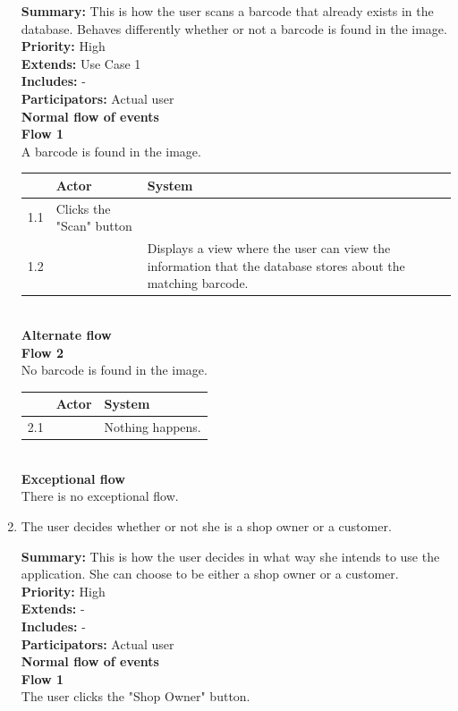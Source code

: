 \documentclass{report}
\begin{document}
\begin{enumerate}
    \textbf{Summary:} This is how the user scans a barcode that already exists in the database. Behaves differently whether or not a barcode is found in the image. \\
    \textbf{Priority:} High \\
    \textbf{Extends:} Use Case 1 \\
    \textbf{Includes:} - \\
    \textbf{Participators:} Actual user \\
    \textbf{Normal flow of events} \\
    \textbf{Flow 1} \\ A barcode is found in the image. \\

    \begin{tabular}{ | l | p{4cm} | p{4cm} |}
    \hline
      & Actor & System \\ \hline
    1.1 & Clicks the "Scan" button & \\ \hline
    1.2 & & Displays a view where the user can view the information that the database stores about the matching barcode. \\
    \hline
    \end{tabular} \\

    \textbf{Alternate flow} \\
    \textbf{Flow 2} \\ No barcode is found in the image. \\

    \begin{tabular}{ | l | p{4cm} | p{4cm} |}
    \hline
      & Actor & System \\ \hline
    2.1 & & Nothing happens. \\
    \hline
    \end{tabular} \\

    \textbf{Exceptional flow} \\ There is no exceptional flow.

  \item The user decides whether or not she is a shop owner or a customer. \

    \textbf{Summary:} This is how the user decides in what way she intends to use the application. She can choose to be either a shop owner or a customer. \\
    \textbf{Priority:} High \\
    \textbf{Extends:} - \\
    \textbf{Includes:} - \\
    \textbf{Participators:} Actual user \\
    \textbf{Normal flow of events} \\
    \textbf{Flow 1} \\ The user clicks the "Shop Owner" button. \\


\end{enumerate}
\end{document}
